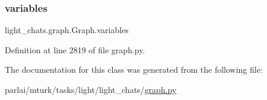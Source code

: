 \subsubsection{\texorpdfstring{variables}{variables}}
{\footnotesize\ttfamily light\+\_\+chats.\+graph.\+Graph.\+variables}



Definition at line 2819 of file graph.\+py.



The documentation for this class was generated from the following file\+:\begin{DoxyCompactItemize}
\item 
parlai/mturk/tasks/light/light\+\_\+chats/\hyperlink{parlai_2mturk_2tasks_2light_2light__chats_2graph_8py}{graph.\+py}\end{DoxyCompactItemize}
